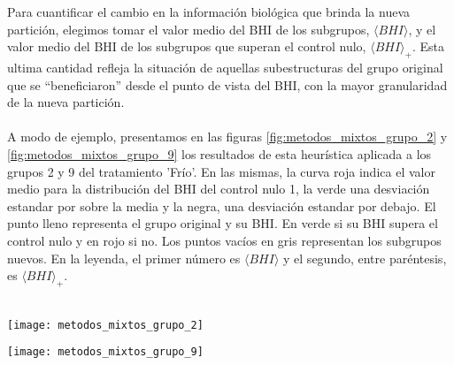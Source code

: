 Para cuantificar el cambio en la información biológica que brinda la nueva partición, elegimos tomar el valor medio del BHI de los subgrupos, $\langle BHI \rangle$, y el valor medio del BHI de los subgrupos que superan el control nulo, $\langle BHI \rangle _{+}$. Esta ultima cantidad refleja la situación de aquellas subestructuras del grupo original que se ``beneficiaron'' desde el punto de vista del BHI, con la mayor granularidad de la nueva partición.\\\\
A modo de ejemplo, presentamos en las figuras \ref{fig:metodos_mixtos_grupo_2} y \ref{fig:metodos_mixtos_grupo_9} los resultados de esta heurística aplicada a los grupos 2 y 9 del tratamiento 'Frío'. En las mismas, la curva roja indica el valor medio para la distribución del BHI del control nulo 1, la verde una desviación estandar por sobre la media y la negra, una desviación estandar por debajo. El punto lleno representa el grupo original y su BHI. En verde si su BHI supera el control nulo y en rojo si no. Los puntos vacíos en gris representan los subgrupos nuevos. En la leyenda, el primer número es $\langle BHI \rangle$ y el segundo, entre paréntesis, es $\langle BHI \rangle _{+}$.\\\\
\clearpage
\begin{sidewaysfigure}[H]
 \centering
\texttt{[image: metodos\_mixtos\_grupo\_2]}
\label{fig:metodos_mixtos_grupo_2}
\end{sidewaysfigure}

\begin{sidewaysfigure}[H]
 \centering
\texttt{[image: metodos\_mixtos\_grupo\_9]}
\label{fig:metodos_mixtos_grupo_9}
\end{sidewaysfigure}

